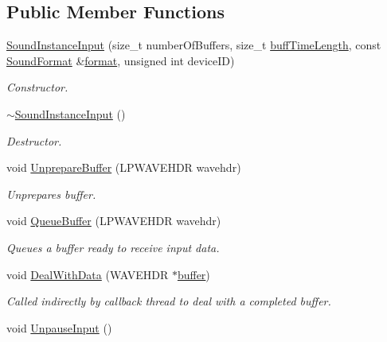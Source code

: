 \subsection*{Public Member Functions}
\begin{DoxyCompactItemize}
\item 
\hyperlink{class_sound_instance_input_a5549f461326cbca077a19122e6eca26b}{SoundInstanceInput} (size\_\-t numberOfBuffers, size\_\-t \hyperlink{class_sound_instance_input_a137354d9a5e6153530b2627dbc402268}{buffTimeLength}, const \hyperlink{class_sound_format}{SoundFormat} \&\hyperlink{class_sound_instance_input_ab28bbe2734e18d0a3f6d9f65362efd78}{format}, unsigned int deviceID)
\begin{DoxyCompactList}\small\item\em Constructor. \item\end{DoxyCompactList}\item 
\hypertarget{class_sound_instance_input_a635280ec3adf535c5f52cbae3972fcbf}{
\hyperlink{class_sound_instance_input_a635280ec3adf535c5f52cbae3972fcbf}{$\sim$SoundInstanceInput} ()}
\label{class_sound_instance_input_a635280ec3adf535c5f52cbae3972fcbf}

\begin{DoxyCompactList}\small\item\em Destructor. \item\end{DoxyCompactList}\item 
void \hyperlink{class_sound_instance_input_af416714d51906b3cf661ef5b851dff26}{UnprepareBuffer} (LPWAVEHDR wavehdr)
\begin{DoxyCompactList}\small\item\em Unprepares buffer. \item\end{DoxyCompactList}\item 
void \hyperlink{class_sound_instance_input_a82324daf23733f5bb89352e20eb6c330}{QueueBuffer} (LPWAVEHDR wavehdr)
\begin{DoxyCompactList}\small\item\em Queues a buffer ready to receive input data. \item\end{DoxyCompactList}\item 
void \hyperlink{class_sound_instance_input_a4d96b12701ad12fbe19e259c23d69ef8}{DealWithData} (WAVEHDR $\ast$\hyperlink{class_sound_instance_input_a07337eba668678c1483c679b8a702ab6}{buffer})
\begin{DoxyCompactList}\small\item\em Called indirectly by callback thread to deal with a completed buffer. \item\end{DoxyCompactList}\item 
\hypertarget{class_sound_instance_input_abd6b98866629cd3f3d2aca9e329e7f5d}{
void \hyperlink{class_sound_instance_input_abd6b98866629cd3f3d2aca9e329e7f5d}{UnpauseInput} ()}
\label{class_sound_instance_input_abd6b98866629cd3f3d2aca9e329e7f5d}


\end{DoxyCompactItemize}
